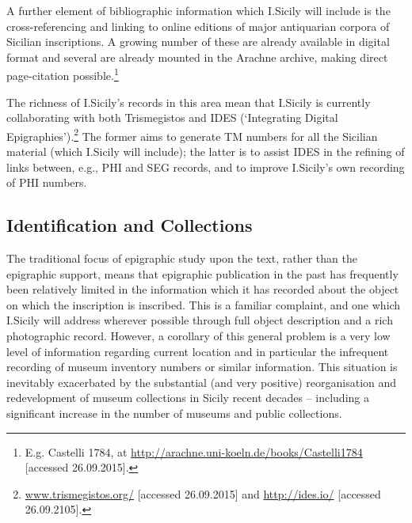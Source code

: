 \documentclass[amsthm,ebook]{saparticle}
\begin{document}
A further element of bibliographic information which I.Sicily will include is the cross-referencing and linking to
online editions of major antiquarian corpora of Sicilian inscriptions. A growing number of these are already available
in digital format and several are already mounted in the Arachne archive, making direct page-citation
possible.\footnote{ E.g. Castelli 1784, at \url{http://arachne.uni-koeln.de/books/Castelli1784} [accessed 26.09.2015].}

The richness of I.Sicily’s records in this area mean that I.Sicily is currently collaborating with both Trismegistos and
IDES (`Integrating Digital Epigraphies').\footnote{\url{www.trismegistos.org/} [accessed 26.09.2015] and \url{http://ides.io/}
[accessed 26.09.2105].} The former aims to generate TM numbers for all the Sicilian material (which I.Sicily will
include); the latter is to assist IDES in the refining of links between, e.g., PHI and SEG records, and to improve
I.Sicily’s own recording of PHI numbers.




\subsection{Identification and Collections}


\noindent The traditional focus of epigraphic study upon the text, rather than the epigraphic support, means that epigraphic
publication in the past has frequently been relatively limited in the information which it has recorded about the
object on which the inscription is inscribed. This is a familiar complaint, and one which I.Sicily will address
wherever possible through full object description and a rich photographic record. However, a corollary of this general
problem is a very low level of information regarding current location and in particular the infrequent recording of
museum inventory numbers or similar information. This situation is inevitably exacerbated by the substantial (and very
positive) reorganisation and redevelopment of museum collections in Sicily recent decades – including a significant
increase in the number of museums and public collections.
\end{document}
